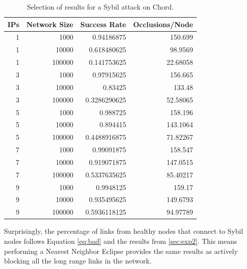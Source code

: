 \begin{table}\small
	\centering
	\caption{Selection of results for a Sybil attack on Chord.} %
	\label{tab:exp3}
	
	\begin{tabular}{|r|r|r|r|}
		\hline 
		IPs & Network Size &   Success Rate & Occlusions/Node \\ \hline
		1 & 1000 & 0.94186875 & 150.699 \\ \hline
		1 & 10000 & 0.618480625 & 98.9569 \\ \hline
		1 & 100000 & 0.141753625 & 22.68058 \\ \hline
		3 & 1000 & 0.97915625 & 156.665 \\ \hline
		3 & 10000 & 0.83425 & 133.48 \\ \hline
		3 & 100000 & 0.3286290625 & 52.58065 \\ \hline
		5 & 1000 & 0.988725 & 158.196 \\ \hline
		5 & 10000 & 0.894415 & 143.1064 \\ \hline
		5 & 100000 & 0.4488916875 & 71.82267 \\ \hline
		7 & 1000 & 0.99091875 & 158.547 \\ \hline
		7 & 10000 & 0.919071875 & 147.0515 \\ \hline
		7 & 100000 & 0.5337635625 & 85.40217 \\ \hline
		9 & 1000 & 0.9948125 & 159.17 \\ \hline
		9 & 10000 & 0.935495625 & 149.6793 \\ \hline
		9 & 100000 & 0.5936118125 & 94.97789 \\ \hline
		
		
	\end{tabular}
	
	
	
\end{table}





Surprisingly, the percentage of links from healthy nodes that connect to Sybil nodes follows Equation \ref{eq:bad} and the results from \ref{sec:exp2}.
This means performing a Nearest Neighbor Eclipse provides the same results as actively blocking all the long range links in the network.

